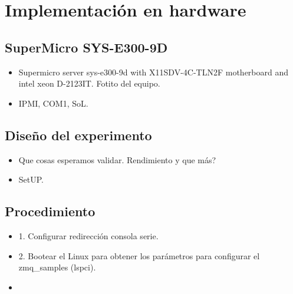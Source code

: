 \chapter{Implementación en hardware}
    \section{SuperMicro SYS-E300-9D}
    \begin{itemize}
        \item Supermicro server sys-e300-9d with X11SDV-4C-TLN2F motherboard and intel xeon D-2123IT. Fotito del equipo.
        \item IPMI, COM1, SoL.
    \end{itemize}
    \section{Diseño del experimento}
    \begin{itemize}
        \item Que cosas esperamos validar. Rendimiento y que más?
        \item SetUP.
    \end{itemize}
    \section{Procedimiento}
    \begin{itemize}
        \item 1. Configurar redirección consola serie.
        \item 2. Bootear el Linux para obtener los parámetros para configurar el zmq\_samples (lspci).
        \item 
    \end{itemize}